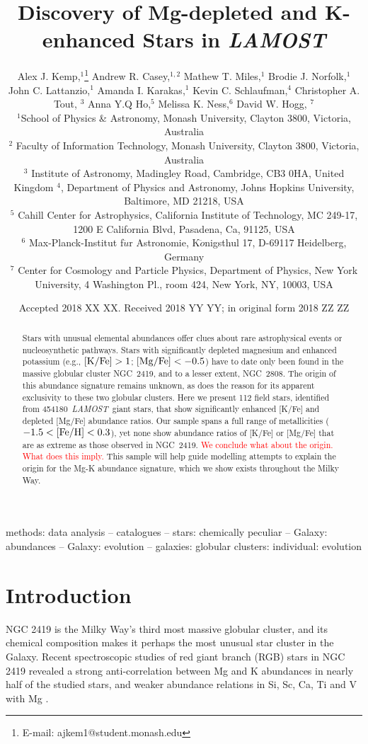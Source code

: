 \documentclass[a4paper,fleqn,usenatbib]{mnras}
\title[Mg-K anti-correlation in LAMOST]{Discovery of Mg-depleted and K-enhanced Stars in \textit{LAMOST}}
\author[Kemp et al.]{
Alex J. Kemp,$^{1}$\thanks{E-mail: ajkem1@student.monash.edu}
Andrew R. Casey,$^{1,2}$
Mathew T. Miles,$^{1}$
Brodie J. Norfolk,$^{1}$\newauthor
John C. Lattanzio,$^{1}$
Amanda I. Karakas,$^{1}$
Kevin C. Schlaufman,$^{4}$\newauthor
Christopher A. Tout, $^{3}$
Anna Y.Q Ho,$^{5}$
Melissa K. Ness,$^{6}$
David W. Hogg, $^{7}$
\\
$^{1}$School of Physics \& Astronomy, Monash University, Clayton 3800, Victoria, Australia\\
$^{2}$ Faculty of Information Technology, Monash University, Clayton 3800, Victoria, Australia\\
$^{3}$ Institute of Astronomy, Madingley Road, Cambridge, CB3 0HA, United Kingdom
$^{4}$, Department of Physics and Astronomy, Johns Hopkins University, Baltimore, MD 21218, USA\\
$^{5}$ Cahill Center for Astrophysics, California Institute of Technology, MC 249-17, 1200 E California Blvd, Pasadena, Ca, 91125, USA\\
$^{6}$ Max-Planck-Institut f$\ddot{u}$r Astronomie, K$\ddot{o}$nigsthul 17, D-69117 Heidelberg, Germany\\
$^{7}$ Center for Cosmology and Particle Physics, Department of Physics, New York University, 4 Washington Pl., room 424, New York, NY, 10003, USA\\
}
\date{Accepted 2018 XX XX. Received 2018 YY YY; in original form 2018 ZZ ZZ}
\newcommand{\todo}[1]{\textcolor{red}{#1}}
\newcommand{\LamostGiants}{454180}
\newcommand{\project}[1]{\emph{#1}}
\newcommand{\lamost}{\project{LAMOST}}
\begin{document}
\label{firstpage}
\pagerange{\pageref{firstpage}--\pageref{lastpage}}
\maketitle


\begin{abstract}
Stars with unusual elemental abundances offer clues about rare astrophysical events or nucleosynthetic pathways. Stars with significantly depleted magnesium and enhanced potassium (e.g., $[{\rm K}/{\rm Fe}] > 1$; $[{\rm Mg}/{\rm Fe}] < -0.5$) have to date only been found in the massive globular cluster NGC~2419, and to a lesser extent, NGC~2808. The origin of this abundance signature remains unknown, as does the reason for its apparent exclusivity to these two globular clusters. Here we present 112 field stars, identified from \LamostGiants\ \lamost\ giant stars, that show significantly enhanced [K/Fe] and depleted [Mg/Fe] abundance ratios.
Our sample spans a full range of metallicities ($-1.5 < [{\rm Fe}/{\rm H}] < 0.3$), yet none show abundance ratios of [K/Fe] or [Mg/Fe] that are as extreme as those observed in NGC~2419. 
\todo{We conclude what about the origin. What does this imply.}
This sample will help guide modelling attempts to explain the origin for the Mg-K abundance signature, which we show exists throughout the Milky Way.
\end{abstract}

\begin{keywords}
methods: data analysis -- catalogues -- stars: chemically peculiar -- Galaxy: abundances -- Galaxy: evolution -- galaxies: globular clusters: individual: evolution
\end{keywords}



\section{Introduction}
\label{sec:intro}
NGC 2419 is the Milky Way's third most massive globular cluster, and its chemical composition makes it perhaps the most unusual star cluster in the Galaxy. Recent spectroscopic studies of red giant branch (RGB) stars in NGC 2419 revealed a strong anti-correlation between Mg and K abundances in nearly half of the studied stars, and weaker abundance relations in Si, Sc, Ca, Ti and V with Mg \citep{mucciarelli2012,cohenkirby2012}.
\end{document}
